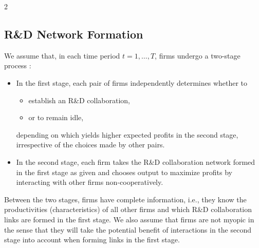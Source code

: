 \documentclass[12pt]{article}
\begin{document}
\begin{spacing}{2}
\subsection{R\&D Network Formation}
\label{sec:dyn-rnd}
We assume that, in each time period $t=1,\ldots,T$, firms undergo a two-stage process \citep{hsieh2020specification}:
\begin{itemize}
\item In the first stage, each pair of firms independently determines whether to 
\begin{itemize}
\item[(i)] establish an R\&D collaboration,  
\item[(ii)] or to remain idle, 
\end{itemize}
depending on which yields higher expected profits in the second stage, irrespective of the choices made by other pairs. 
\item In the second stage, each firm takes the R\&D collaboration network formed in the first stage as given and chooses output to maximize  profits by interacting with other firms non-cooperatively. 
\end{itemize}
Between the two stages, firms have complete information, i.e., they know the productivities (characteristics) of all other firms and which R\&D collaboration links are formed in the first  stage. We also assume that firms are not myopic in the sense that they will take the potential benefit of interactions in the second stage into account when forming links in the first stage.


\end{spacing}
\end{document}
